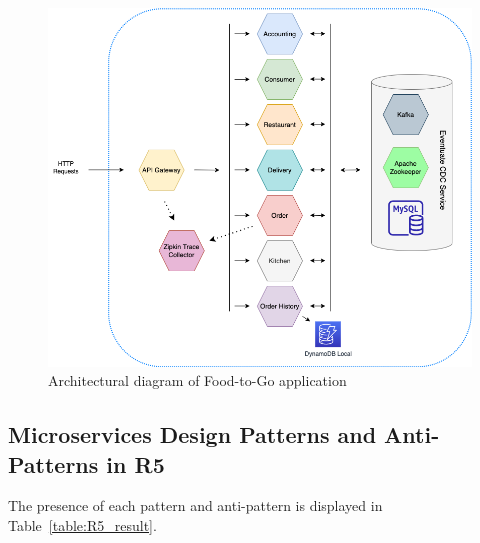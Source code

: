 \documentclass{Configuration_Files/PoliMi3i_thesis}
\begin{document}
\begin{figure}[H]
\centering
\includegraphics[width=1\textwidth]{myImages/R5.png}
\caption{Architectural diagram of Food-to-Go application}
\label{fig:R5_arch}
\end{figure}

\subsection{Microservices Design Patterns and Anti-Patterns in R5}
\label{subsec:R5_detection}

The presence of each pattern and anti-pattern is displayed in Table~\ref{table:R5_result}.
\end{document}
